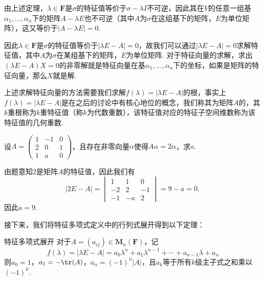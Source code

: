 由上述定理，$\lambda\in\mathbf{F}$是$\sigma$的特征值等价于$\sigma-\lambda I$不可逆，因此其在$V$的任意一组基$\alpha_1,\ldots,\alpha_n$下的矩阵$A-\lambda E$也不可逆（其中$A$为$\sigma$在这组基下的矩阵，$E$为单位矩阵），这又等价于$|A-\lambda E|=0$.

因此$\lambda\in\mathbf{F}$是$\sigma$的特征值等价于$|\lambda E-A|=0$，故我们可以通过$|\lambda E-A|=0$求解特征值，其中$A$为$\sigma$在某组基下的矩阵，$E$为单位矩阵. 对于特征向量的求解，求出$(\lambda E-A)X=0$的非零解就是特征向量在基$\alpha_1,\ldots,\alpha_n$下的坐标，如果是矩阵的特征向量，那么$X$就是解.

上述求解特征向量的方法需要我们求解$f(\lambda)=|\lambda E-A|$的根，事实上$f(\lambda)=|\lambda E-A|$是在之后的讨论中有核心地位的概念，我们称其为矩阵$A$的，其$k$重根称为$k$重特征值（称$k$为代数重数），该特征值对应的特征子空间维数称为该特征值的几何重数.

\begin{example}{}{}
    设$A=\begin{pmatrix}
            1 & -1 & 0 \\ 2 & 0 & 1 \\ 1 & a & 0
        \end{pmatrix}$，且存在非零向量$\alpha$使得$A\alpha=2\alpha$，求$a$.
\end{example}

\begin{solution}
    由题意知2是矩阵$A$的特征值，因此我们有
    \[|2E-A|=\begin{vmatrix}
            1 & 1 & 0 \\ -2 & 2 & -1 \\ -1 & -a & 2
        \end{vmatrix}=9-a=0,\]
    因此$a=9$.
\end{solution}

接下来，我们将特征多项式定义中的行列式展开得到以下定理：
\begin{theorem}{}{特征多项式展开}
    对于$A=(a_{ij})\in\mathbf{M}_n(\mathbf{F})$，记
    \[f(\lambda)=|\lambda E-A|=a_0\lambda^n+a_1\lambda^{n-1}+\cdots+a_{n-1}\lambda+a_n\]
    则$a_0=1$，$a_1=-\tr(A)$，$a_n=(-1)^n|A|$，且$a_k$等于所有$k$级主子式之和乘以$(-1)^k$.
\end{theorem}

